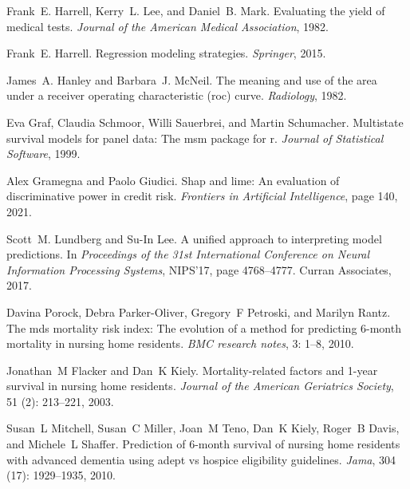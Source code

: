 \documentclass{article}
\begin{document}
\begin{thebibliography}{60}
Frank~E. Harrell, Kerry~L. Lee, and Daniel~B. Mark.
\newblock Evaluating the yield of medical tests.
\newblock \emph{Journal of the American Medical Association}, 1982.

Frank~E. Harrell.
\newblock Regression modeling strategies.
\newblock \emph{Springer}, 2015.

James~A. Hanley and Barbara~J. McNeil.
\newblock The meaning and use of the area under a receiver operating
  characteristic (roc) curve.
\newblock \emph{Radiology}, 1982.

Eva Graf, Claudia Schmoor, Willi Sauerbrei, and Martin Schumacher.
\newblock Multistate survival models for panel data: The msm package for r.
\newblock \emph{Journal of Statistical Software}, 1999.

Alex Gramegna and Paolo Giudici.
\newblock Shap and lime: An evaluation of discriminative power in credit risk.
\newblock \emph{Frontiers in Artificial Intelligence}, page 140, 2021.

Scott~M. Lundberg and Su-In Lee.
\newblock A unified approach to interpreting model predictions.
\newblock In \emph{Proceedings of the 31st International Conference on Neural
  Information Processing Systems}, NIPS'17, page 4768–4777. Curran
  Associates, 2017.

Davina Porock, Debra Parker-Oliver, Gregory~F Petroski, and Marilyn Rantz.
\newblock The mds mortality risk index: The evolution of a method for
  predicting 6-month mortality in nursing home residents.
\newblock \emph{BMC research notes}, 3: 1--8, 2010.

Jonathan~M Flacker and Dan~K Kiely.
\newblock Mortality-related factors and 1-year survival in nursing home
  residents.
\newblock \emph{Journal of the American Geriatrics Society}, 51
  (2): 213--221, 2003.

Susan~L Mitchell, Susan~C Miller, Joan~M Teno, Dan~K Kiely, Roger~B Davis, and
  Michele~L Shaffer.
\newblock Prediction of 6-month survival of nursing home residents with
  advanced dementia using adept vs hospice eligibility guidelines.
\newblock \emph{Jama}, 304 (17): 1929--1935, 2010.


\end{thebibliography}
\end{document}
